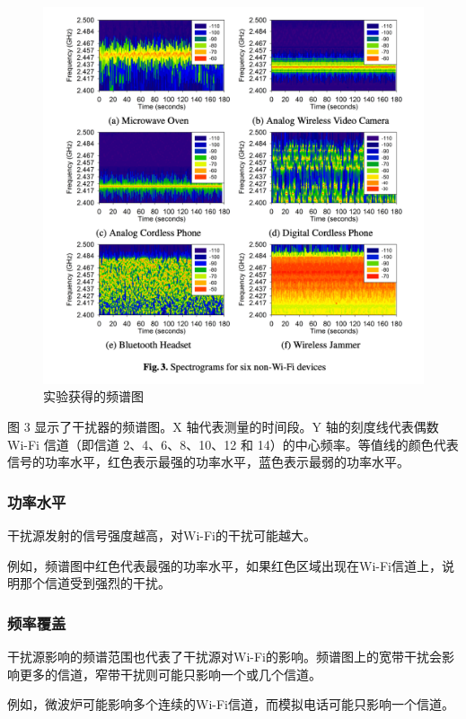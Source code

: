\begin{figure}[h]
    \centering
    \includegraphics[width=17cm]{res/wifi1.png}
    \caption{实验获得的频谱图}
\end{figure}

图 3 显示了干扰器的频谱图。X 轴代表测量的时间段。Y 轴的刻度线代表偶数 Wi-Fi 信道（即信道 2、4、6、8、10、12 和 14）的中心频率。等值线的颜色代表信号的功率水平，红色表示最强的功率水平，蓝色表示最弱的功率水平。

\subsubsection{功率水平}

干扰源发射的信号强度越高，对Wi-Fi的干扰可能越大。

例如，频谱图中红色代表最强的功率水平，如果红色区域出现在Wi-Fi信道上，说明那个信道受到强烈的干扰。

\subsubsection{频率覆盖}

干扰源影响的频谱范围也代表了干扰源对Wi-Fi的影响。频谱图上的宽带干扰会影响更多的信道，窄带干扰则可能只影响一个或几个信道。

例如，微波炉可能影响多个连续的Wi-Fi信道，而模拟电话可能只影响一个信道。

